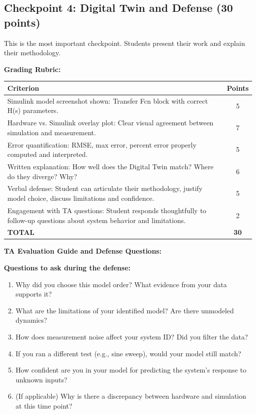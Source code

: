 \documentclass[11pt,letterpaper]{article}
\begin{document}
\subsection{Checkpoint 4: Digital Twin and Defense (30 points)}

This is the most important checkpoint. Students present their work and explain their methodology.

\textbf{Grading Rubric:}

\begin{center}
\begin{tabularx}{0.95\textwidth}{|X|c|}
\hline
\textbf{Criterion} & \textbf{Points} \\
\hline
Simulink model screenshot shown: Transfer Fcn block with correct H(s) parameters. & 5 \\
\hline
Hardware vs. Simulink overlay plot: Clear visual agreement between simulation and measurement. & 7 \\
\hline
Error quantification: RMSE, max error, percent error properly computed and interpreted. & 5 \\
\hline
Written explanation: How well does the Digital Twin match? Where do they diverge? Why? & 6 \\
\hline
Verbal defense: Student can articulate their methodology, justify model choice, discuss limitations and confidence. & 5 \\
\hline
Engagement with TA questions: Student responds thoughtfully to follow-up questions about system behavior and limitations. & 2 \\
\hline
\textbf{TOTAL} & \textbf{30} \\
\hline
\end{tabularx}
\end{center}

\noindent
\textbf{TA Evaluation Guide and Defense Questions:}

\noindent
\textbf{Questions to ask during the defense:}

\begin{enumerate}
    \item Why did you choose this model order? What evidence from your data supports it?
    \item What are the limitations of your identified model? Are there unmodeled dynamics?
    \item How does measurement noise affect your system ID? Did you filter the data?
    \item If you ran a different test (e.g., sine sweep), would your model still match?
    \item How confident are you in your model for predicting the system's response to unknown inputs?
    \item (If applicable) Why is there a discrepancy between hardware and simulation at this time point?
\end{enumerate}
\end{document}

